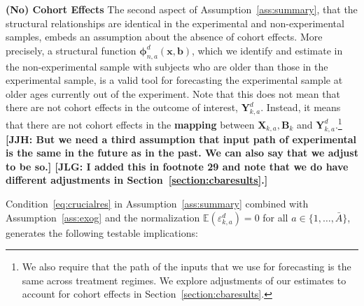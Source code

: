 \begin{remark} \label{remark:cohort} \textbf{(No) Cohort Effects}
The second aspect of Assumption~\ref{ass:summary}, that the structural relationships are identical in the experimental and non-experimental samples, embeds an assumption about the absence of cohort effects. More precisely, a structural function $\bm{\phi}_{n,a}^d \left( \bm{x}, \bm{b} \right)$, which we identify and estimate in the non-experimental sample with subjects who are older than those in the experimental sample, is a valid tool for forecasting the experimental sample at older ages currently out of the experiment. Note that this does not mean that there are not cohort effects in the outcome of interest, $\bm{Y}_{k,a}^d$. Instead, it means that there are not cohort effects in the \textbf{mapping} between $\bm{X}_{k,a}, \bm{B}_k$ and $\bm{Y}_{k,a}^d$.\footnote{We also require that the path of the inputs that we use for forecasting is the same across treatment regimes. We explore adjustments of our estimates to account for cohort effects in Section~\ref{section:cbaresults}.} \textbf{[JJH: But we need a third assumption that input path of experimental is the same in the future as in the past. We can also say that we adjust to be so.] [JLG: I added this in footnote 29 and note that we do have different adjustments in Section~\ref{section:cbaresults}.]} 
\end{remark}
\doublespacing

Condition~\eqref{eq:crucialres} in Assumption~\ref{ass:summary} combined with Assumption~\ref{ass:exog} and the normalization $\mathbb{E}(\varepsilon^d_{k,a})=0$ for all $a \in \{1,\dots,\bar{A}\}$, generates the following testable implications:


